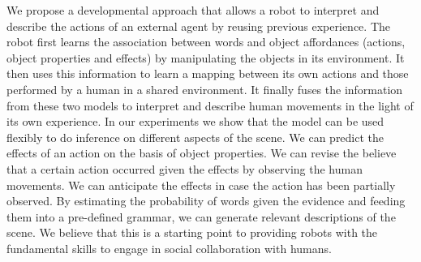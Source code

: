 We propose a developmental approach that allows a robot to interpret and describe the actions of an external agent by reusing previous experience.
The robot first learns the association between words and object affordances (actions, object properties and effects) by manipulating the objects in its environment.
It then uses this information to learn a mapping between its own actions and those performed by a human in a shared environment.
It finally fuses the information from these two models to interpret and describe human movements in the light of its own experience.
In our experiments we show that the model can be used flexibly to do inference on different aspects of the scene.
We can predict the effects of an action on the basis of object properties.
We can revise the believe that a certain action occurred given the effects by observing the human movements.
We can anticipate the effects in case the action has been partially observed.
By estimating the probability of words given the evidence and feeding them into a pre-defined grammar, we can generate relevant descriptions of the scene.
We believe that this is a starting point to providing robots with the fundamental skills to engage in social collaboration with humans.
